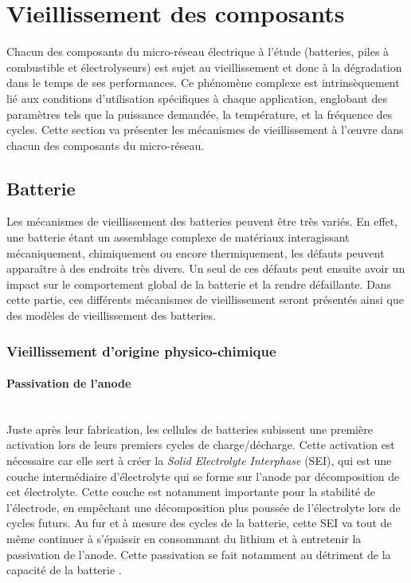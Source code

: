 \section{Vieillissement des composants}
Chacun des composants du micro-réseau électrique à l'étude (batteries, piles à combustible et électrolyseurs) est sujet au vieillissement et donc à la dégradation dans le temps de ses performances. Ce phénomène complexe est intrinsèquement lié aux conditions d'utilisation spécifiques à chaque application, englobant des paramètres tels que la puissance demandée, la température, et la fréquence des cycles. Cette section va présenter les mécanismes de vieillissement à l'\oe uvre dans chacun des composants du micro-réseau.

\subsection{Batterie}
Les mécanismes de vieillissement des batteries peuvent être très variés. En effet, une batterie étant un assemblage complexe de matériaux interagissant mécaniquement, chimiquement ou encore thermiquement, les défauts peuvent apparaître à des endroits très divers. Un seul de ces défauts peut ensuite avoir un impact sur le comportement global de la batterie et la rendre défaillante. Dans cette partie, ces différents mécanismes de vieillissement seront présentés ainsi que des modèles de vieillissement des batteries.
\subsubsection{Vieillissement d'origine physico-chimique}
\paragraph{Passivation de l'anode}\hfill \\
Juste après leur fabrication, les cellules de batteries subissent une première activation lors de leurs premiers cycles de charge/décharge. Cette activation est nécessaire car elle sert à créer la \textit{Solid Electrolyte Interphase} (SEI), qui est une couche intermédiaire d'électrolyte qui se forme sur l'anode par décomposition de cet électrolyte. Cette couche est notamment importante pour la stabilité de l'électrode, en empêchant une décomposition plus poussée de l'électrolyte lors de cycles futurs. Au fur et à mesure des cycles de la batterie, cette SEI va tout de même continuer à s'épaissir en consommant du lithium et à entretenir la passivation de l'anode. Cette passivation se fait notamment au détriment de la capacité de la batterie \cite{he_effect_2013}\cite{edstrom_new_2006}.


